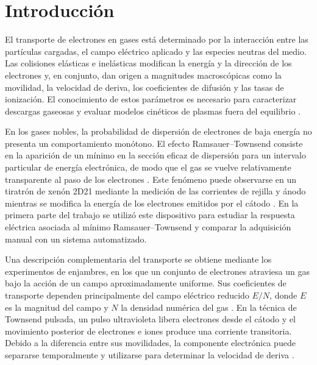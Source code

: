 
\section{Introducción}
\label{sec:introduccion}

El transporte de electrones en gases está determinado por la interacción entre las partículas cargadas, el campo eléctrico aplicado y las especies neutras del medio. Las colisiones elásticas e inelásticas modifican la energía y la dirección de los electrones y, en conjunto, dan origen a magnitudes macroscópicas como la movilidad, la velocidad de deriva, los coeficientes de difusión y las tasas de ionización. El conocimiento de estos parámetros es necesario para caracterizar descargas gaseosas y evaluar modelos cinéticos de plasmas fuera del equilibrio \cite{GonzalezMagana2024,Jovanovic2009}.

En los gases nobles, la probabilidad de dispersión de electrones de baja energía no presenta un comportamiento monótono. El efecto Ramsauer--Townsend consiste en la aparición de un mínimo en la sección eficaz de dispersión para un intervalo particular de energía electrónica, de modo que el gas se vuelve relativamente transparente al paso de los electrones \cite{Ramsauer1921}. Este fenómeno puede observarse en un tiratrón de xenón 2D21 mediante la medición de las corrientes de rejilla y ánodo mientras se modifica la energía de los electrones emitidos por el cátodo \cite{Kukolich1968}. En la primera parte del trabajo se utilizó este dispositivo para estudiar la respuesta eléctrica asociada al mínimo Ramsauer--Townsend y comparar la adquisición manual con un sistema automatizado.

Una descripción complementaria del transporte se obtiene mediante los experimentos de enjambres, en los que un conjunto de electrones atraviesa un gas bajo la acción de un campo aproximadamente uniforme. Sus coeficientes de transporte dependen principalmente del campo eléctrico reducido $E/N$, donde $E$ es la magnitud del campo y $N$ la densidad numérica del gas \cite{GonzalezMagana2019}. En la técnica de Townsend pulsada, un pulso ultravioleta libera electrones desde el cátodo y el movimiento posterior de electrones e iones produce una corriente transitoria. Debido a la diferencia entre sus movilidades, la componente electrónica puede separarse temporalmente y utilizarse para determinar la velocidad de deriva \cite{Jovanovic2009}.


